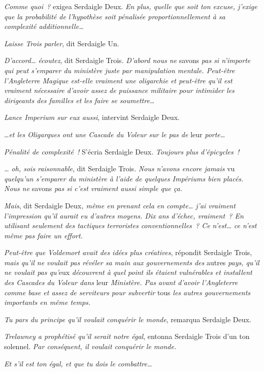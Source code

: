 \emph{Comme quoi~?} exigea Serdaigle Deux. \emph{En plus, quelle que soit ton excuse, j'exige que la probabilité de l'hypothèse soit pénalisée proportionnellement à sa complexité additionnelle…}

\emph{Laisse Trois parler}, dit Serdaigle Un.

\emph{D'accord… écoutez}, dit Serdaigle Trois. \emph{D'abord nous ne} savons \emph{pas si n'importe qui peut s'emparer du ministère juste par manipulation mentale. Peut-être l'Angleterre Magique est-elle vraiment une oligarchie et peut-être qu'il est vraiment nécessaire d'avoir assez de puissance militaire pour intimider les dirigeants des familles et les faire se soumettre…}

\emph{Lance Imperium sur eux aussi}, intervint Serdaigle Deux.

…\emph{et les Oligarques ont une Cascade du Voleur sur le pas de} leur \emph{porte…}

\emph{Pénalité de complexité~!} S'écria Serdaigle Deux. \emph{Toujours plus d'épicycles~!}

\emph{… oh, sois raisonnable}, dit Serdaigle Trois. \emph{Nous n'avons encore jamais} vu \emph{quelqu'un s'emparer du ministère à l'aide de quelques Impériums bien placés. Nous ne} savons \emph{pas si c'est vraiment aussi simple que ça.}

\emph{Mais}, dit Serdaigle Deux\emph{, même en prenant cela en compte… j'ai vraiment l'impression qu'il aurait eu d'autres moyens. Dix ans d'échec, vraiment~? En utilisant seulement des tactiques terroristes conventionnelles~? Ce n'est… ce n'est même pas faire un effort.}

\emph{Peut-être que Voldemort avait des idées plus créatives}, répondit Serdaigle Trois, \emph{mais qu'il ne voulait pas révéler sa main aux gouvernements des} autres \emph{pays, qu'il ne voulait pas qu'}eux \emph{découvrent à quel point ils étaient vulnérables et installent des Cascades du Voleur dans} leur \emph{Ministère. Pas avant d'avoir l'Angleterre comme base et assez de serviteurs pour subvertir} tous \emph{les autres gouvernements importants en même temps.}

\emph{Tu pars du principe qu'il voulait conquérir le monde}, remarqua Serdaigle Deux.

\emph{Trelawney a prophétisé qu'il serait notre égal}, entonna Serdaigle Trois d'un ton solennel. \emph{Par conséquent, il voulait conquérir le monde.}

\emph{Et s'il est ton égal, et que tu dois le combattre…}

